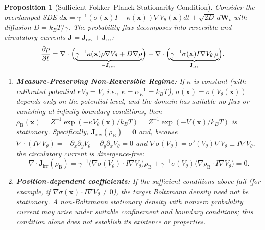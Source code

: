 \documentclass{article}
\newtheorem{proposition}[definition]{Proposition}
\begin{document}
\begin{proposition}[Sufficient Fokker--Planck Stationarity Condition]
\label{prop:stationarity}
Consider the overdamped SDE $d\mathbf{x} = \gamma^{-1}(\sigma(\mathbf{x}) I - \kappa(\mathbf{x}))\nabla V_\theta(\mathbf{x}) dt + \sqrt{2 D}\, d\mathbf{W}_t$ with diffusion $D = k_B T / \gamma$. The probability flux decomposes into reversible and circulatory currents $\mathbf{J} = \mathbf{J}_{\text{rev}} + \mathbf{J}_{\text{irr}}$:
\begin{equation}
\frac{\partial \rho}{\partial t} = \nabla \cdot \Bigl(\underbrace{\gamma^{-1}\kappa(\mathbf{x}) \rho \nabla V_\theta + D \nabla \rho}_{-\mathbf{J}_{\text{rev}}}\Bigr) - \nabla \cdot \Bigl(\underbrace{\gamma^{-1}\sigma(\mathbf{x}) I \nabla V_\theta \, \rho}_{\mathbf{J}_{\text{irr}}}\Bigr).
\end{equation}
\begin{enumerate}
    \item \textbf{Measure-Preserving Non-Reversible Regime:} If $\kappa$ is constant (with calibrated potential $\kappa V_\theta = V$, i.e., $\kappa = \alpha_E^{-1} = k_B T$), $\sigma(\mathbf{x}) = \sigma(V_\theta(\mathbf{x}))$ depends only on the potential level, and the domain has suitable no-flux or vanishing-at-infinity boundary conditions, then $\rho_{\text{B}}(\mathbf{x}) = Z^{-1}\exp(-\kappa V_\theta(\mathbf{x})/k_B T) = Z^{-1}\exp(-V(\mathbf{x})/k_B T)$ is stationary. Specifically, $\mathbf{J}_{\text{rev}}(\rho_{\text{B}}) = \mathbf{0}$ and, because $\nabla \cdot (I \nabla V_\theta) = -\partial_x\partial_y V_\theta + \partial_y\partial_x V_\theta = 0$ and $\nabla \sigma(V_\theta) = \sigma'(V_\theta)\nabla V_\theta \perp I \nabla V_\theta$, the circulatory current is divergence-free:
    \begin{equation}
    \nabla \cdot \mathbf{J}_{\text{irr}}(\rho_{\text{B}}) = \gamma^{-1}\bigl(\nabla \sigma(V_\theta) \cdot I \nabla V_\theta\bigr)\rho_{\text{B}} + \gamma^{-1}\sigma(V_\theta) \bigl(\nabla \rho_{\text{B}} \cdot I \nabla V_\theta\bigr) = 0.
    \end{equation}
    \item \textbf{Position-dependent coefficients:} If the sufficient conditions above fail (for example, if $\nabla \sigma(\mathbf{x}) \cdot I \nabla V_\theta \neq 0$), the target Boltzmann density need not be stationary. A non-Boltzmann stationary density with nonzero probability current may arise under suitable confinement and boundary conditions; this condition alone does not establish its existence or properties.
\end{enumerate}
\end{proposition}
\end{document}
